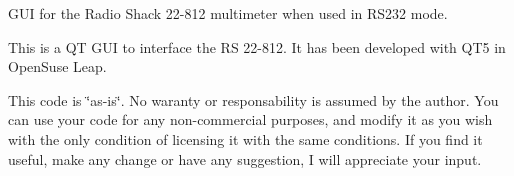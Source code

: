 G\-U\-I for the Radio Shack 22-\/812 multimeter when used in R\-S232 mode.

This is a Q\-T G\-U\-I to interface the R\-S 22-\/812. It has been developed with Q\-T5 in Open\-Suse Leap.

This code is \char`\"{}as-\/is\char`\"{}. No waranty or responsability is assumed by the author. You can use your code for any non-\/commercial purposes, and modify it as you wish with the only condition of licensing it with the same conditions. If you find it useful, make any change or have any suggestion, I will appreciate your input. 